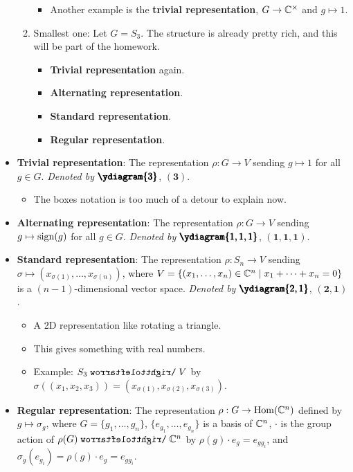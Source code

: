 \documentclass[../notes.tex]{subfiles}
\begin{document}
\begin{itemize}
\begin{enumerate}
\begin{itemize}
            \item Another example is the \textbf{trivial representation}, $G\to\mathbb{C}^\times$ and $g\mapsto 1$.
        \end{itemize}
        \item Smallest one: Let $G=S_3$. The structure is already pretty rich, and this will be part of the homework.
        \begin{itemize}
            \item \textbf{Trivial representation} again.
            \item \textbf{Alternating representation}.
            \item \textbf{Standard representation}.
            \item \textbf{Regular representation}.
        \end{itemize}
    \end{enumerate}
    \item \textbf{Trivial representation}: The representation $\rho:G\to V$ sending $g\mapsto 1$ for all $g\in G$. \emph{Denoted by} $\pmb{\ydiagram{3}}$, $\bm{(3)}$.
    \begin{itemize}
        \item The boxes notation is too much of a detour to explain now.
    \end{itemize}
    \item \textbf{Alternating representation}: The representation $\rho:G\to V$ sending $g\mapsto\operatorname{sign}(g)$ for all $g\in G$. \emph{Denoted by} $\pmb{\ydiagram{1,1,1}}$, $\bm{(1,1,1)}$.
    \item \textbf{Standard representation}: The representation $\rho:S_n\to V$ sending $\sigma\mapsto(x_{\sigma(1)},\dots,x_{\sigma(n)})$, where $V=\{(x_1,\dots,x_n)\in\mathbb{C}^n\mid x_1+\cdots+x_n=0\}$ is a $(n-1)$-dimensional vector space. \emph{Denoted by} $\pmb{\ydiagram{2,1}}$, $\bm{(2,1)}$.
    \begin{itemize}
        \item A 2D representation like rotating a triangle.
        \item This gives something with real numbers.
        \item Example: $S_3\acts V$ by $\sigma((x_1,x_2,x_3))=(x_{\sigma(1)},x_{\sigma(2)},x_{\sigma(3)})$.
    \end{itemize}
    \item \textbf{Regular representation}: The representation $\rho:G\to\operatorname{Hom}(\mathbb{C}^n)$ defined by $g\mapsto\sigma_g$, where $G=\{g_1,\dots,g_n\}$, $\{e_{g_1},\dots,e_{g_n}\}$ is a basis of $\mathbb{C}^n$, $\cdot$ is the group action of $\rho(G)\acts\C^n$ by $\rho(g)\cdot e_g=e_{gg_i}$, and $\sigma_g(e_{g_i})=\rho(g)\cdot e_g=e_{gg_i}$.

\end{itemize}
\end{document}
